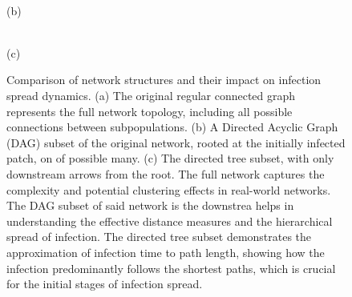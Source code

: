 \begin{figure}[ht]
\begin{minipage}[b]{0.3\textwidth}
\\
        \centering
        {(b)}
    \end{minipage}
    \begin{minipage}[b]{0.3\textwidth}
        \\
        \centering
        {(c)}
    \end{minipage}
    \caption{\small Comparison of network structures and their impact on infection spread dynamics. 
    (a) The original regular connected graph represents the full network topology, including all possible connections between subpopulations. 
    (b) A Directed Acyclic Graph (DAG) subset of the original network, rooted at the initially infected patch, on of possible many.
    (c) The directed tree subset, with only downstream arrows from the root.
     The full network captures the complexity and potential clustering effects in real-world networks. The DAG subset of said network is the downstrea helps in understanding the effective distance measures and the hierarchical spread of infection. The directed tree subset demonstrates the approximation of infection time to path length, showing how the infection predominantly follows the shortest paths, which is crucial for the initial stages of infection spread.}
    \label{fig: graph subsets}
\end{figure}


    
% 